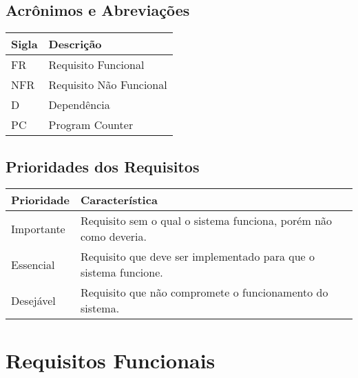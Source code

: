 \documentclass{article}
\begin{document}
  \subsection{Acrônimos e Abreviações}
    \FloatBarrier
    \begin{table}[H]
      \begin{center}
        \begin{tabular}[pos]{|m{2cm} | m{12cm}|} 
          \hline
          \cellcolor[gray]{0.9}\textbf{Sigla} & \cellcolor[gray]{0.9}\textbf{Descrição} \\ \hline
          FR      & Requisito Funcional  \\ \hline
          NFR     & Requisito Não Funcional  \\ \hline
          D       & Dependência  \\ \hline
		  PC      & Program Counter \\ \hline 
        \end{tabular}
      \end{center}
    \end{table}  

  \subsection{Prioridades dos Requisitos}
    \FloatBarrier
    \begin{table}[H]
      \begin{center}
        \begin{tabular}[pos]{|m{2cm} | m{12cm}|} 
          \hline
          \cellcolor[gray]{0.9}\textbf{Prioridade} & \cellcolor[gray]{0.9}\textbf{Característica} \\ \hline
          Importante      & Requisito sem o qual o sistema funciona, porém não como deveria.  \\ \hline
          Essencial       & Requisito que deve ser implementado para que o sistema funcione.  \\ \hline
          Desejável       & Requisito que não compromete o funcionamento do sistema.  \\ \hline
        \end{tabular}
      \end{center}
    \end{table}  

\section{Requisitos Funcionais}
\end{document}
